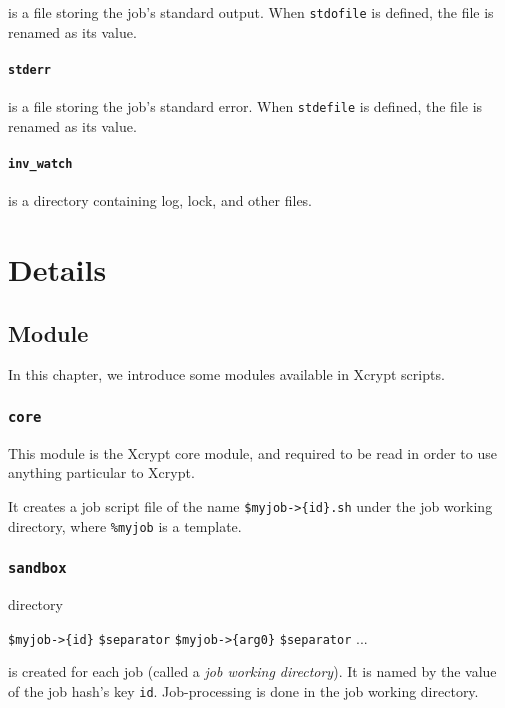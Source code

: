 \documentclass[a4paper,10pt]{report}
\begin{document}
is a file storing the job's standard output.  When \texttt{stdofile}
is defined, the file is renamed as its value.

\subsection*{\texttt{stderr}}

is a file storing the job's standard error.  When \texttt{stdefile}
is defined, the file is renamed as its value.

\subsection*{\texttt{inv\_watch}}

is a directory containing log, lock, and other files.

\part{Details}

\chapter{Module}\label{chapmodule}

In this chapter, we introduce some modules available in Xcrypt scripts.

\section{\texttt{core}}

This module is the Xcrypt core module, and required to be read in
order to use anything particular to Xcrypt.

It creates a job script file of the name \texttt{\$myjob->\{id\}.sh}
under the job working directory, where \texttt{\%myjob} is a template.

\section{\texttt{sandbox}}

directory

\begin{center}
 \texttt{\$myjob->\{id\}} \texttt{\$separator}
 \texttt{\$myjob->\{arg0\}} \texttt{\$separator} ...
\end{center}

is created for each job (called a \textit{job working directory}).  It is
named by the value of the job hash's key \texttt{id}.  Job-processing
is done in the job working directory.
\end{document}
